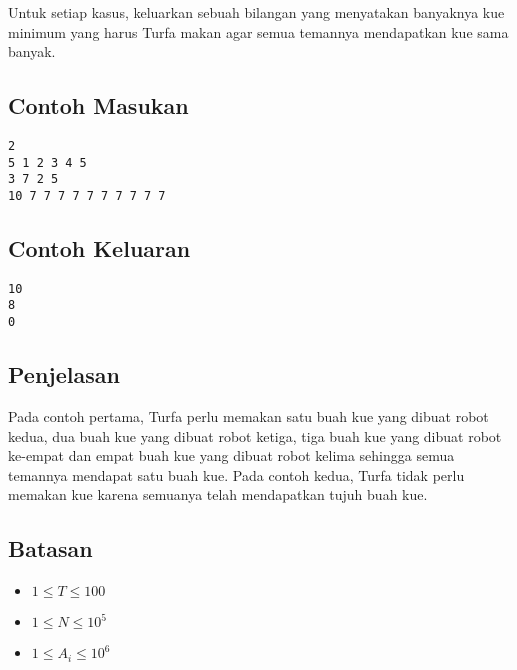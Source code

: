 \documentclass{article}
\begin{document}
\par Untuk setiap kasus, keluarkan sebuah bilangan yang menyatakan banyaknya kue minimum yang harus Turfa makan agar semua temannya mendapatkan kue sama banyak.

\subsection*{Contoh Masukan}

\begin{lstlisting}
2
5 1 2 3 4 5
3 7 2 5
10 7 7 7 7 7 7 7 7 7 7
\end{lstlisting}

\subsection*{Contoh Keluaran}

\begin{lstlisting}
10
8
0
\end{lstlisting}

\subsection*{Penjelasan}

Pada contoh pertama, Turfa perlu memakan satu buah kue yang dibuat robot kedua, dua buah kue yang dibuat robot ketiga, tiga buah kue yang dibuat robot ke-empat dan empat buah kue yang dibuat robot kelima sehingga semua temannya mendapat satu buah kue.
Pada contoh kedua, Turfa tidak perlu memakan kue karena semuanya telah mendapatkan tujuh buah kue.

\subsection*{Batasan}

\begin{itemize}
	\item $1 \leq T \leq 100$
	\item $1 \leq N \leq 10^5$
	\item $1 \leq A_i \leq 10^6$
\end{itemize}
\end{document}
